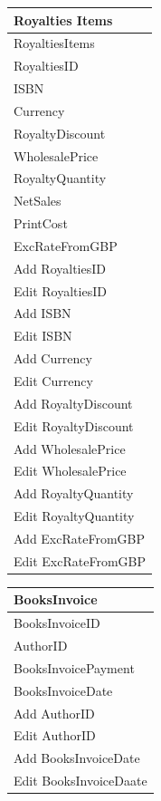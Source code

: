 \begin{tabular}{|p{2.5cm}|}
    \hline
    \textbf{Royalties Items} \\ \hline
    RoyaltiesItems \\ RoyaltiesID \\ ISBN \\ Currency \\ RoyaltyDiscount \\ WholesalePrice \\ RoyaltyQuantity \\ NetSales \\ PrintCost \\ ExcRateFromGBP \\ \hline
    Add RoyaltiesID \\ Edit RoyaltiesID \\ Add ISBN \\ Edit ISBN \\ Add Currency \\ Edit Currency \\ Add RoyaltyDiscount \\ Edit RoyaltyDiscount \\ Add WholesalePrice \\ Edit WholesalePrice \\ Add RoyaltyQuantity \\ Edit RoyaltyQuantity \\ Add ExcRateFromGBP \\ Edit ExcRateFromGBP \\ \hline
\end{tabular}

\begin{tabular}{|p{2.5cm}|}
    \hline
    \textbf{BooksInvoice} \\ \hline
    BooksInvoiceID \\ AuthorID \\ BooksInvoicePayment \\ BooksInvoiceDate \\ \hline
    Add AuthorID \\ Edit AuthorID \\ Add BooksInvoiceDate \\ Edit BooksInvoiceDaate \\ \hline
\end{tabular}

